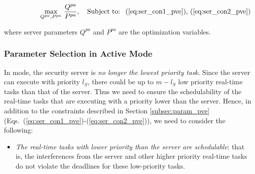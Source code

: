 \documentclass[../rt_server_main.tex]{subfiles}
\begin{document}
\begin{myoptimizationproblem} \label{opt:server_param_pve}
\vspace*{-2.0em}
\begin{subequations}
\begin{align}
\hspace*{5em}
\underset{Q^{pa}, P^{pa}}{\operatorname{max}}~ \frac{Q^{pa}}{P^{pa}}, \quad  %
\text{Subject to:~  (\ref{eq:ser_con1_pve}), (\ref{eq:ser_con2_pve})} \nonumber
\end{align}
\end{subequations}
\end{myoptimizationproblem}
\hspace{-1.9em} 
where server parameters $Q^{pa}$ and $P^{pa}$ are the optimization variables.


\subsubsection{Parameter Selection in Active Mode} \label{subsec:param_ave}



In \ave mode, the security server is \textit{no longer the lowest priority task}. Since the server can execute with priority $l_S$, there could be up to $m - l_S$ low priority real-time tasks than that of the server. Thus we need to ensure the schedulability of the real-time tasks that are executing with a priority lower than the server. Hence, in addition to the constraints described in Section \ref{subsec:param_pve} (\ie Eqs.~(\ref{eq:ser_con1_pve})-(\ref{eq:ser_con2_pve})), we need to consider the following:

\begin{itemize}
\item \textit{The real-time tasks with lower priority than the server are schedulable}: that is, the interferences from the server and other higher priority real-time tasks do not violate the deadlines for these low-priority tasks.
\end{itemize}
\end{document}
